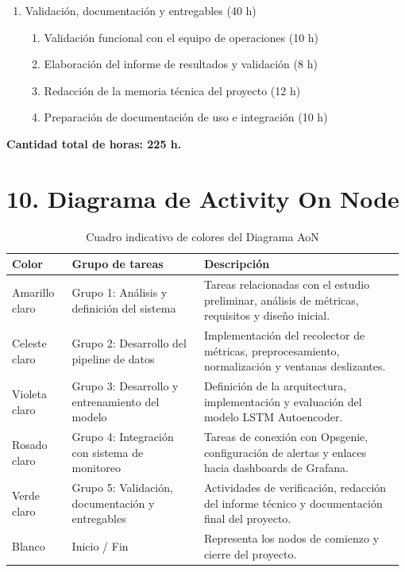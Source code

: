 \documentclass[
11pt, %
]{charter}
\begin{document}
\begin{enumerate}
\item Validación, documentación y entregables (40 h)
\begin{enumerate}
\item Validación funcional con el equipo de operaciones (10 h)
\item Elaboración del informe de resultados y validación (8 h)
\item Redacción de la memoria técnica del proyecto (12 h)
\item Preparación de documentación de uso e integración (10 h)
\end{enumerate}
\end{enumerate}

\textbf{Cantidad total de horas: 225 h.}

\section{10. Diagrama de Activity On Node}
\label{sec:AoN}

\begin{table}[H]
\centering
\begin{tabular}{|>{\centering\arraybackslash}p{0.15\linewidth}|>{\raggedright\arraybackslash}p{0.33\linewidth}|>{\raggedright\arraybackslash}p{0.5\linewidth}|}
\hline
\rowcolor[HTML]{EFEFEF}
\textbf{Color} & \textbf{Grupo de tareas} & \textbf{Descripción} \\ \hline

\cellcolor[HTML]{FFF2CC} Amarillo claro & Grupo 1: Análisis y definición del sistema & Tareas relacionadas con el estudio preliminar, análisis de métricas, requisitos y diseño inicial. \\ \hline

\cellcolor[HTML]{DAE8FC} Celeste claro & Grupo 2: Desarrollo del pipeline de datos & Implementación del recolector de métricas, preprocesamiento, normalización y ventanas deslizantes. \\ \hline

\cellcolor[HTML]{E1D5E7} Violeta claro & Grupo 3: Desarrollo y entrenamiento del modelo & Definición de la arquitectura, implementación y evaluación del modelo LSTM Autoencoder. \\ \hline

\cellcolor[HTML]{F8CECC} Rosado claro & Grupo 4: Integración con sistema de monitoreo & Tareas de conexión con Opsgenie, configuración de alertas y enlaces hacia dashboards de Grafana. \\ \hline

\cellcolor[HTML]{D5E8D4} Verde claro & Grupo 5: Validación, documentación y entregables & Actividades de verificación, redacción del informe técnico y documentación final del proyecto. \\ \hline

\cellcolor[HTML]{FFFFFF} Blanco & Inicio / Fin & Representa los nodos de comienzo y cierre del proyecto. \\ \hline

\end{tabular}
\caption{Cuadro indicativo de colores del Diagrama AoN}
\end{table}
\end{document}
